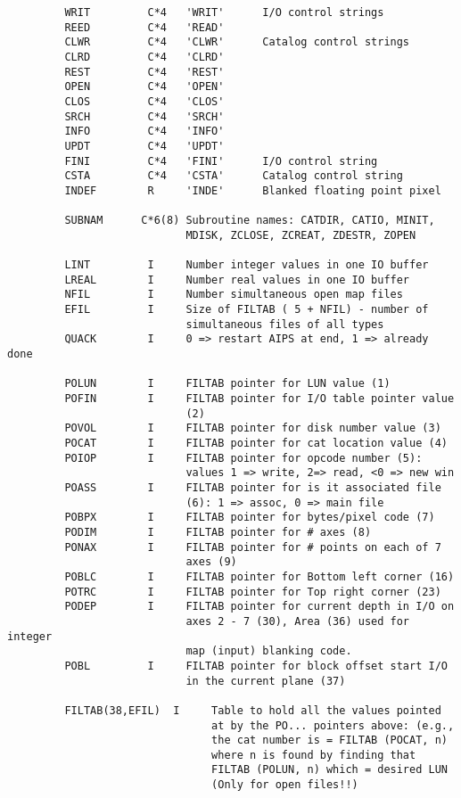 \begin{verbatim}
         WRIT         C*4   'WRIT'      I/O control strings
         REED         C*4   'READ'
         CLWR         C*4   'CLWR'      Catalog control strings
         CLRD         C*4   'CLRD'
         REST         C*4   'REST'
         OPEN         C*4   'OPEN'
         CLOS         C*4   'CLOS'
         SRCH         C*4   'SRCH'
         INFO         C*4   'INFO'
         UPDT         C*4   'UPDT'
         FINI         C*4   'FINI'      I/O control string
         CSTA         C*4   'CSTA'      Catalog control string
         INDEF        R     'INDE'      Blanked floating point pixel

         SUBNAM      C*6(8) Subroutine names: CATDIR, CATIO, MINIT,
                            MDISK, ZCLOSE, ZCREAT, ZDESTR, ZOPEN

         LINT         I     Number integer values in one IO buffer
         LREAL        I     Number real values in one IO buffer
         NFIL         I     Number simultaneous open map files
         EFIL         I     Size of FILTAB ( 5 + NFIL) - number of
                            simultaneous files of all types
         QUACK        I     0 => restart AIPS at end, 1 => already done

         POLUN        I     FILTAB pointer for LUN value (1)
         POFIN        I     FILTAB pointer for I/O table pointer value
                            (2)
         POVOL        I     FILTAB pointer for disk number value (3)
         POCAT        I     FILTAB pointer for cat location value (4)
         POIOP        I     FILTAB pointer for opcode number (5):
                            values 1 => write, 2=> read, <0 => new win
         POASS        I     FILTAB pointer for is it associated file
                            (6): 1 => assoc, 0 => main file
         POBPX        I     FILTAB pointer for bytes/pixel code (7)
         PODIM        I     FILTAB pointer for # axes (8)
         PONAX        I     FILTAB pointer for # points on each of 7
                            axes (9)
         POBLC        I     FILTAB pointer for Bottom left corner (16)
         POTRC        I     FILTAB pointer for Top right corner (23)
         PODEP        I     FILTAB pointer for current depth in I/O on
                            axes 2 - 7 (30), Area (36) used for integer
                            map (input) blanking code.
         POBL         I     FILTAB pointer for block offset start I/O
                            in the current plane (37)

         FILTAB(38,EFIL)  I     Table to hold all the values pointed
                                at by the PO... pointers above: (e.g.,
                                the cat number is = FILTAB (POCAT, n)
                                where n is found by finding that
                                FILTAB (POLUN, n) which = desired LUN
                                (Only for open files!!)


\end{verbatim}
